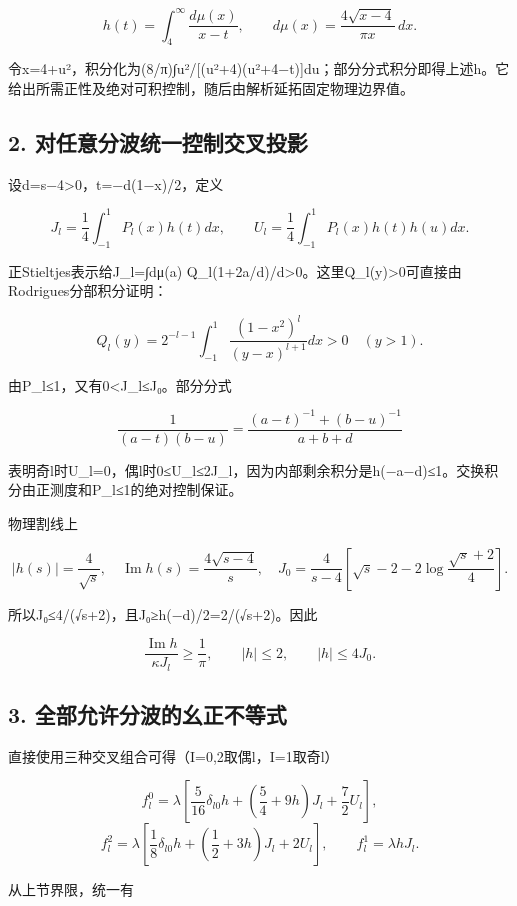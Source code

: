 \documentclass[
  10pt,
  a4paper,
]{article}
\begin{document}
\[
h(t)=\int_4^\infty\frac{d\mu(x)}{x-t},\qquad
d\mu(x)=\frac{4\sqrt{x-4}}{\pi x}\,dx.
\]

令x=4+u²，积分化为(8/π)∫u²/{[}(u²+4)(u²+4−t){]}du；部分分式积分即得上述h。它给出所需正性及绝对可积控制，随后由解析延拓固定物理边界值。

\subsection{2.
对任意分波统一控制交叉投影}\label{ux5bf9ux4efbux610fux5206ux6ce2ux7edfux4e00ux63a7ux5236ux4ea4ux53c9ux6295ux5f71}

设d=s−4\textgreater0，t=−d(1−x)/2，定义

\[
J_l=\frac14\int_{-1}^1P_l(x)h(t)dx,
\qquad U_l=\frac14\int_{-1}^1P_l(x)h(t)h(u)dx.
\]

正Stieltjes表示给J\_l=∫dμ(a)
Q\_l(1+2a/d)/d\textgreater0。这里Q\_l(y)\textgreater0可直接由Rodrigues分部积分证明：

\[
Q_l(y)=2^{-l-1}\int_{-1}^1\frac{(1-x^2)^l}{(y-x)^{l+1}}dx>0\quad(y>1).
\]

由\textbar P\_l\textbar≤1，又有0\textless J\_l≤J₀。部分分式

\[
\frac1{(a-t)(b-u)}=\frac{(a-t)^{-1}+(b-u)^{-1}}{a+b+d}
\]

表明奇l时U\_l=0，偶l时0≤U\_l≤2J\_l，因为内部剩余积分是h(−a−d)≤1。交换积分由正测度和\textbar P\_l\textbar≤1的绝对控制保证。

物理割线上

\[
|h(s)|=\frac4{\sqrt s},\quad
\operatorname{Im}h(s)=\frac{4\sqrt{s-4}}s,\quad
J_0=\frac4{s-4}\left[\sqrt s-2-2\log\frac{\sqrt s+2}4\right].
\]

所以J₀≤4/(√s+2)，且J₀≥h(−d)/2=2/(√s+2)。因此

\[
\frac{\operatorname{Im}h}{\kappa J_l}\ge\frac1\pi,
\qquad |h|\le2,\qquad |h|\le4J_0.
\]

\subsection{3.
全部允许分波的幺正不等式}\label{ux5168ux90e8ux5141ux8bb8ux5206ux6ce2ux7684ux5e7aux6b63ux4e0dux7b49ux5f0f}

直接使用三种交叉组合可得（I=0,2取偶l，I=1取奇l）

\[
f_l^0=\lambda\left[\frac5{16}\delta_{l0}h+
(\frac54+9h)J_l+\frac72U_l\right],
\] \[
f_l^2=\lambda\left[\frac18\delta_{l0}h+
(\frac12+3h)J_l+2U_l\right],
\qquad f_l^1=\lambda hJ_l.
\]

从上节界限，统一有
\end{document}
